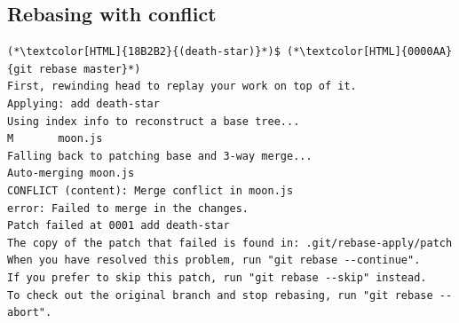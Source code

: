 




\subsection{Rebasing with conflict}
\begin{frame}[fragile]
  \subslidetitle
  \begin{lstlisting}
(*\textcolor[HTML]{18B2B2}{(death-star)}*)$ (*\textcolor[HTML]{0000AA}{git rebase master}*)
First, rewinding head to replay your work on top of it.
Applying: add death-star
Using index info to reconstruct a base tree...
M       moon.js
Falling back to patching base and 3-way merge...
Auto-merging moon.js
CONFLICT (content): Merge conflict in moon.js
error: Failed to merge in the changes.
Patch failed at 0001 add death-star
The copy of the patch that failed is found in: .git/rebase-apply/patch
When you have resolved this problem, run "git rebase --continue".
If you prefer to skip this patch, run "git rebase --skip" instead.
To check out the original branch and stop rebasing, run "git rebase --abort".
\end{lstlisting}
\end{frame}

